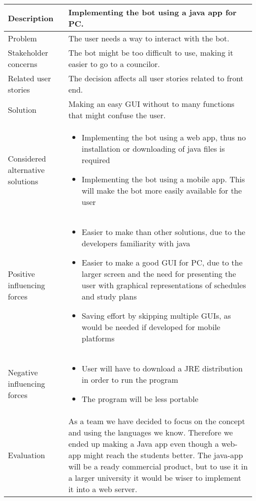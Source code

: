 \documentclass[pdftex, 10pt, norsk, a4paper, twoside]{article}
\numberwithin{equation}{section}
\numberwithin{figure}{section}
\numberwithin{table}{section}
\begin{document}
\newpage

\begin{center} %

\hfill

\section*{}

\begin{tabular}{| >{\centering\arraybackslash} m{4cm} | m{9cm} | }
\hline
Description & Implementing the bot using a java app for PC. \\
\hline
Problem & The user needs a way to interact with the bot. \\
\hline
Stakeholder concerns & The bot might be too difficult to use, making it easier to go to a councilor. \\
\hline
Related user stories & The decision affects all user stories related to front end. \\
\hline
Solution & Making an easy GUI without to many functions that might confuse the user. \\
\hline
Considered alternative solutions & 
\begin{itemize}
    \item Implementing the bot using a web app, thus no installation or downloading of java files is required
    \item Implementing the bot using a mobile app. This will make the bot more easily available for the user
\end{itemize} \\
\hline
Positive influencing forces &
\begin{itemize}
    \item Easier to make than other solutions, due to the developers familiarity with java
    \item Easier to make a good GUI for PC, due to the larger screen and the need for presenting the user with graphical representations of schedules and study plans
    \item Saving effort by skipping multiple GUIs, as would be needed if developed for mobile platforms
\end{itemize} \\
\hline
Negative influencing forces &
\begin{itemize}
    \item User will have to download a JRE distribution in order to run the program
    \item The program will be less portable
\end{itemize} \\
\hline
Evaluation &  As a team we have decided to focus on the concept and using the languages we know. Therefore we ended up making a Java app even though a web-app might reach the students better. The java-app will be a ready commercial product, but to use it in a larger university it would be wiser to implement it into a web server. \\
\hline
\end{tabular}
\end{center}  %
\end{document}
